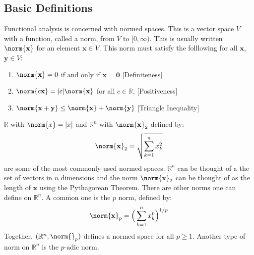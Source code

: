 \documentclass[crop=false,class=book,oneside]{standalone}                      %
\begin{document}
        \subsection{Basic Definitions}
            Functional analysis is concerned with normed spaces.
            This is a vector space $V$ with a function, called
            a norm, from $V$ to $[0,\infty)$. This is usually
            written $\norm{\mathbf{x}}$ for an element
            $\mathbf{x}\in{V}$. This norm must satisfy the
            folllowing for all $\mathbf{x}$, $\mathbf{y}\in{V}$:
            \begin{enumerate}
                \item $\norm{\mathbf{x}}=0$ if and only
                      if $\mathbf{x}=\mathbf{0}$
                      \hfill[Definiteness]
                \item $\norm{c\mathbf{x}}=|c|\norm{\mathbf{x}}$
                      for all $c\in\mathbb{R}$.
                      \hfill[Positiveness]
                \item $\norm{\mathbf{x}+\mathbf{y}}%
                       \leq\norm{\mathbf{x}}+\norm{\mathbf{y}}$
                      \hfill[Triangle Inequality]
            \end{enumerate}
            \begin{example}
                $\mathbb{R}$ with $\norm{x}=|x|$ and
                $\mathbb{R}^{n}$ with $\norm{\mathbf{x}}_{2}$
                defined by:
                \begin{equation*}
                    \norm{\mathbf{x}}_{2}
                    =\sqrt{\sum_{k=1}^{n}x_{k}^{2}}
                \end{equation*}
                are some of the most commonly used normed spaces.
                $\mathbb{R}^{n}$ can be thought of a the set
                of vectors in $n$ dimensions and the norm
                $\norm{\mathbf{x}}_{2}$ can be thought of as
                the length of $\mathbf{x}$ using the
                Pythagorean Theorem. There are other norms one
                can define on $\mathbb{R}^{n}$. A common
                one is the $p$ norm, defined by:
                \begin{equation*}
                    \norm{\mathbf{x}}_{p}
                    =\Big(\sum_{k=1}^{n}x_{k}^{p}\Big)^{1/p}
                \end{equation*}
                Together, $(\mathbb{R}^{n},\norm{}_{p})$ defines
                a normed space for all $p\geq{1}$. Another type
                of norm on $\mathbb{R}^{n}$ is the
                $p\textrm{-adic}$ norm.
            \end{example}
\end{document}
